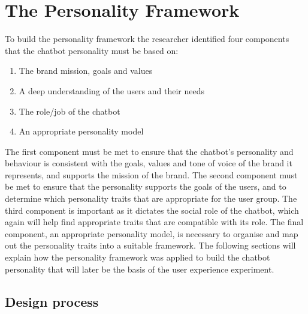 \section{The Personality Framework}

To build the personality framework the researcher identified four components that the chatbot personality must be based on:

\begin{enumerate}
    \item The brand mission, goals and values
    \item A deep understanding of the users and their needs 
    \item The role/job of the chatbot
    \item An appropriate personality model
\end{enumerate}

The first component must be met to ensure that the chatbot's personality and behaviour is consistent with the goals, values and tone of voice of the brand it represents, and supports the mission of the brand. The second component must be met to ensure that the personality supports the goals of the users, and to determine which personality traits that are appropriate for the user group. The third component is important as it dictates the social role of the chatbot, which again will help find appropriate traits that are compatible with its role. The final component, an appropriate personality model, is necessary to organise and map out the personality traits into a suitable framework. The following sections will explain how the personality framework was applied to build the chatbot personality that will later be the basis of the user experience experiment.

\subsection{Design process}

